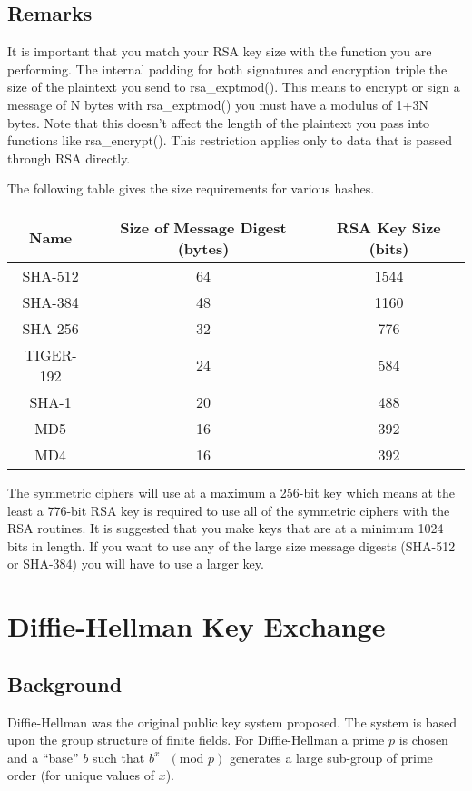 \documentclass{book}
\begin{document}
\section{Remarks}
It is important that you match your RSA key size with the function you are performing.  The internal padding for both
signatures and encryption triple the size of the plaintext you send to rsa\_exptmod().  This means to encrypt or sign
a message of N bytes with rsa\_exptmod() you must have a modulus of 1+3N bytes.  Note that this doesn't affect the length
of the plaintext you pass into functions like rsa\_encrypt().  This restriction applies only to data that is passed through
RSA directly.

The following table gives the size requirements for various hashes.
\begin{center}
\begin{tabular}{|c|c|c|}
      \hline Name & Size of Message Digest (bytes) & RSA Key Size (bits)\\
      \hline SHA-512 & 64 & 1544\\
      \hline SHA-384 & 48 & 1160 \\
      \hline SHA-256 & 32 & 776\\
      \hline TIGER-192 & 24 & 584\\
      \hline SHA-1 & 20 & 488\\
      \hline MD5 & 16 & 392\\
      \hline MD4 & 16 & 392\\
      \hline
\end{tabular}
\end{center}

The symmetric ciphers will use at a maximum a 256-bit key which means at the least a 776-bit RSA key is 
required to use all of the symmetric ciphers with the RSA routines.  It is suggested that you make keys that 
are at a minimum 1024 bits in length.  If you want to use any of the large size message digests 
(SHA-512 or SHA-384) you will have to use a larger key.

\chapter{Diffie-Hellman Key Exchange}

\section{Background}

Diffie-Hellman was the original public key system proposed.  The system is based upon the group structure
of finite fields.  For Diffie-Hellman a prime $p$ is chosen and a ``base'' $b$ such that $b^x\mbox{ }(\mbox{mod }p)$ 
generates a large sub-group of prime order (for unique values of $x$).
\end{document}
